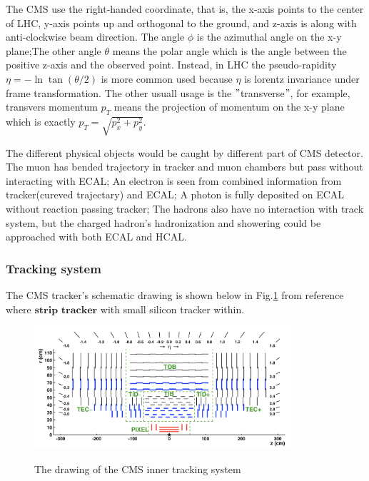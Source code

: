 		The CMS use the right-handed coordinate, that is, the x-axis points to the center of LHC, y-axis points up and orthogonal to the ground, and z-axis is along with anti-clockwise beam direction. The angle $\phi$ is the azimuthal angle on the x-y plane;The other angle $\theta$ means the polar angle which is the angle between the positive z-axis and the observed point. Instead, in LHC the pseudo-rapidity $\eta = -\ln{\tan{(\theta/2)}}$ is more common used because $\eta$ is lorentz invariance under frame transformation. The other usuall usage is the $"$transverse$"$, for example, transvers momentum $p_T$ means the projection of momentum on the x-y plane which is exactly $p_T = \sqrt{p_x^2 + p_y^2}$.

		The different physical objects would be caught by different part of CMS detector. The muon has bended trajectory in tracker and muon chambers but pass without interacting with ECAL; An electron is seen from combined information from tracker(cureved trajectary) and ECAL; A photon is fully deposited on ECAL without reaction passing tracker; The hadrons also have no interaction with track system, but the charged hadron's hadronization and showering could be approached with both ECAL and HCAL.

		\subsubsection{Tracking system}
		\label{sssec:ExpApp_tracking}

			The CMS tracker's schematic drawing is shown below in Fig.\ref{ExpApp:fig:tracker} from reference\cite{Chatrchyan:2014fea} where $\textbf{strip tracker}$ with small silicon tracker within. 

			\begin{figure}[H]
			\centering{}
		    	\includegraphics[width=0.85\textwidth]{Figures/ExpApparatus/tracker.png}\\
			\caption{The drawing of the CMS inner tracking system\cite{Chatrchyan:2014fea}}
			\label{ExpApp:fig:tracker}
			\end{figure}
			\FloatBarrier

